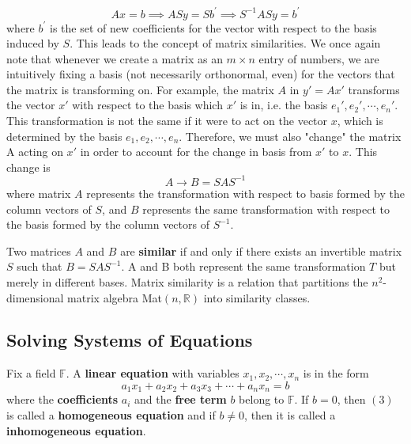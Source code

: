   \begin{equation}
    A x = b \implies A S y = S b^\prime \implies S^{-1} A S y = b^\prime
  \end{equation}
  where $b^\prime$ is the set of new coefficients for the vector with respect to the basis induced by $S$. 
  This leads to the concept of matrix similarities. We once again note that whenever we create a matrix as an $m \times n$ entry of numbers, we are intuitively fixing a basis (not necessarily orthonormal, even) for the vectors that the matrix is transforming on. For example, the matrix $A$ in $y' = Ax'$ transforms the vector $x'$ with respect to the basis which $x'$ is in, i.e. the basis ${e_1', e_2', \cdots, e_n'}$. This transformation is not the same if it were to act on the vector $x$, which is determined by the basis ${e_1, e_2, \cdots, e_n}$. Therefore, we must also "change" the matrix A acting on $x'$ in order to account for the change in basis from $x'$ to $x$. This change is 
  \begin{equation}
    A \rightarrow B = S A S^{-1}
  \end{equation}
  where matrix $A$ represents the transformation with respect to basis formed by the column vectors of $S$, and $B$ represents the same transformation with respect to the basis formed by the column vectors of $S^{-1}$. 

  \begin{definition}
    Two matrices $A$ and $B$ are \textbf{similar} if and only if there exists an invertible matrix $S$ such that $B = S A S^{-1}$. A and B both represent the same transformation $T$ but merely in different bases. Matrix similarity is a relation that partitions the $n^2$-dimensional matrix algebra Mat$(n, \mathbb{R})$ into similarity classes. 
  \end{definition}

\subsection{Solving Systems of Equations}

  \begin{definition}
    Fix a field $\mathbb{F}$. A \textbf{linear equation} with variables $x_1, x_2, \cdots, x_n$ is in the form 
    \begin{equation}
      a_1 x_1 + a_2 x_2 + a_3 x_3 + \cdots + a_n x_n = b
    \end{equation}
    where the \textbf{coefficients} $a_i$ and the \textbf{free term} $b$ belong to $\mathbb{F}$. If $b = 0$, then $(3)$ is called a \textbf{homogeneous equation} and if $b \neq 0$, then it is called a \textbf{inhomogeneous equation}. 
  \end{definition}

